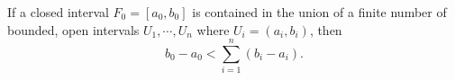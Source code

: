 If a closed interval $F_0 = [a_0, b_0]$ is contained in the union of a finite number of bounded, open intervals $U_1, \cdots, U_n$ where $U_i = (a_i, b_i)$, then
$$b_0 - a_0 < \sum_{i=1}^{n} (b_i - a_i).$$
